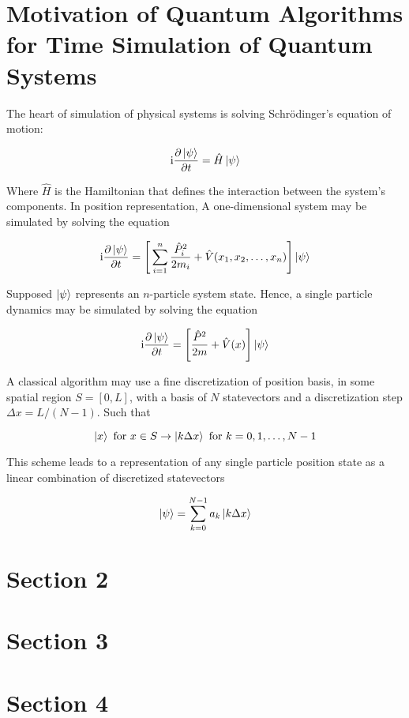 \section{Motivation of Quantum Algorithms for Time Simulation of Quantum Systems}
  The heart of simulation of physical systems is solving Schrödinger's equation of motion:

  \begin{equation}
    \mathrm{i}
    \label{eq:SchEqn}\pdv{\ket{\psi}}{t} = \hat{H} \ket{\psi}
  \end{equation}

  Where $\hat{H}$ is the Hamiltonian that defines the interaction between the system's components. In position representation, A one-dimensional system may be simulated by solving the equation

  \begin{equation}
    \mathrm{i}\pdv{\ket{\psi}}{t} = \Bigg[\sum_{i = 1}^{n} \frac{\hat{P}_i^2}{2m_i} + \hat{V}(x_1, x_2, \ldots, x_n)\Bigg] \ket{\psi}
  \end{equation}

  Supposed $\ket{\psi}$ represents an $n$-particle system state. Hence, a single particle dynamics may be simulated by solving the equation

  \begin{equation}
    \mathrm{i}\pdv{\ket{\psi}}{t} = \Bigg[\frac{\hat{P}^2}{2m} + \hat{V}(x)\Bigg] \ket{\psi}
  \end{equation}

  A classical algorithm may use a fine discretization of position basis, in some spatial region $\mathit{S} = [0,L]$, with a basis of $N$ statevectors and a discretization step $\Delta x = L/(N-1)$. Such that

  \begin{equation}
    \ket{x} \text{ for } x \in S \rightarrow \ket{k \Delta x} \text{ for } k = 0,1,\ldots,N-1
  \end{equation}

  This scheme leads to a representation of any single particle position state as a linear combination of discretized statevectors

  \begin{equation}
    \ket{\psi} = \sum_{k = 0}^{N-1} a_k \ket{k \Delta x}
  \end{equation}

\section{Section 2}
  \lipsum[2-4]

\section{Section 3}
  \lipsum[2-4]

\section{Section 4}
  \lipsum[2-4]
